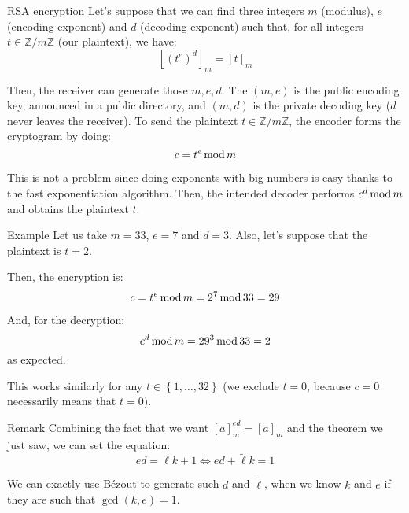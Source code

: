 \documentclass[a4paper]{article}
\begin{document}
\begin{parag}{RSA encryption}
    Let's suppose that we can find three integers $m$ (modulus), $e$ (encoding exponent) and $d$ (decoding exponent) such that, for all integers $t \in \mathbb{Z} / m\mathbb{Z}$ (our plaintext), we have:
    \[\left[\left(t^e\right)^d\right]_m = \left[t\right]_m\]

    Then, the receiver can generate those $m, e, d$. The $\left(m, e\right)$ is the public encoding key, announced in a public directory, and $\left(m, d\right)$ is the private decoding key ($d$ never leaves the receiver). To send the plaintext $t \in \mathbb{Z} / m\mathbb{Z}$, the encoder forms the cryptogram by doing:
    \[c = t^e \operatorname{mod} m\]

    This is not a problem since doing exponents with big numbers is easy thanks to the fast exponentiation algorithm. Then, the intended decoder performs $c^d \operatorname{mod} m$ and obtains the plaintext $t$.

    \begin{subparag}{Example}
        Let us take $m = 33$, $e = 7$ and $d = 3$. Also, let's suppose that the plaintext is $t = 2$.

        Then, the encryption is:
        \[c = t^e \operatorname{mod} m = 2^7 \operatorname{mod} 33 = 29\]

        And, for the decryption:
        \[c^d \operatorname{mod} m = 29^3 \operatorname{mod} 33 = 2\]
        as expected.

        This works similarly for any $t \in \left\{1, \ldots, 32\right\}$ (we exclude $t = 0$, because $c = 0$ necessarily means that $t = 0$).
    \end{subparag}

    \begin{subparag}{Remark}
        Combining the fact that we want $\left[a\right]_m^{ed} = \left[a\right]_m$ and the theorem we just saw, we can set the equation:
        \[ed = \ell k + 1 \iff ed + \widetilde{\ell} k = 1\]

        We can exactly use Bézout to generate such $d$ and $\widetilde{\ell }$, when we know $k$ and $e$ if they are such that $\gcd\left(k, e\right) = 1$.
    \end{subparag}

\end{parag}
\end{document}
